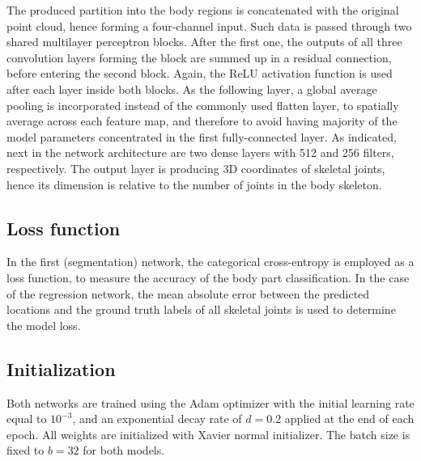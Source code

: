 \noindent The produced partition into the body regions is concatenated with the original point cloud, hence forming a four-channel input. Such data is passed through two shared multilayer perceptron blocks. After the first one, the outputs of all three convolution layers forming the block are summed up in a residual connection, before entering the second block. Again, the ReLU activation function is used after each layer inside both blocks. As the following layer, a global average pooling is incorporated instead of the commonly used flatten layer, to spatially average across each feature map, and therefore to avoid having majority of the model parameters concentrated in the first fully-connected layer. As indicated, next in the network architecture are two dense layers with 512 and 256 filters, respectively. The output layer is producing 3D coordinates of skeletal joints, hence its dimension is relative to the number of joints in the body skeleton.


\subsection{Loss function}
In the first (segmentation) network, the categorical cross-entropy is employed as a loss function, to measure the accuracy of the body part classification. In the case of the regression network, the mean absolute error between the predicted locations and the ground truth labels of all skeletal joints is used to determine the model loss.

\subsection{Initialization}
Both networks are trained using the Adam optimizer with the initial learning rate equal to $10^{-3}$, and an exponential decay rate of $d=0.2$ applied at the end of each epoch. All weights are initialized with Xavier normal initializer. The batch size is fixed to $b=32$ for both models.
